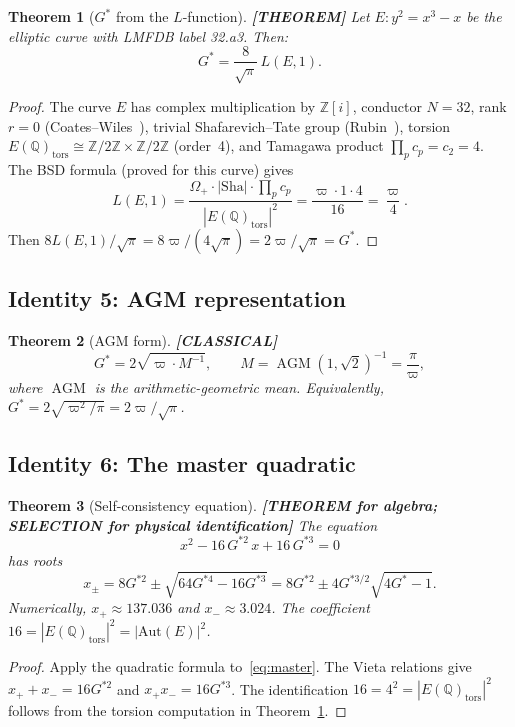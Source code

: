 \documentclass[11pt]{article}
\theoremstyle{tight}
\newtheorem{theorem}{Theorem}[section]
\theoremstyle{plainroman}
\newcommand{\Z}{\mathbb{Z}}
\newcommand{\Q}{\mathbb{Q}}
\begin{document}
\begin{theorem}[$G^*$ from the $L$-function]\label{thm:gstar-L}
\textbf{[THEOREM]}
Let $E:y^2=x^3-x$ be the elliptic curve with LMFDB label 32.a3.
Then:
\begin{equation}\label{eq:gstar-L}
G^*=\frac{8}{\sqrt{\pi}}\,L(E,1).
\end{equation}
\end{theorem}
\begin{proof}
The curve $E$ has complex multiplication by $\Z[i]$, conductor $N=32$, rank $r=0$ (Coates--Wiles~\cite{coateswiles}), trivial Shafarevich--Tate group (Rubin~\cite{rubin}), torsion $E(\Q)_{\mathrm{tors}}\cong\Z/2\Z\times\Z/2\Z$ (order~4), and Tamagawa product $\prod_p c_p=c_2=4$.
The BSD formula (proved for this curve) gives
\[
L(E,1)=\frac{\Omega_+\cdot|\text{Sha}|\cdot\prod_p c_p}{|E(\Q)_{\mathrm{tors}}|^2}=\frac{\varpi\cdot 1\cdot 4}{16}=\frac{\varpi}{4}.
\]
Then $8L(E,1)/\sqrt{\pi}=8\varpi/(4\sqrt{\pi})=2\varpi/\sqrt{\pi}=G^*$.
\end{proof}

\subsection{Identity 5: AGM representation}

\begin{theorem}[AGM form]\label{thm:agm}
\textbf{[CLASSICAL]}
\[
G^*=2\sqrt{\varpi\cdot M^{-1}}, \qquad M=\operatorname{AGM}(1,\sqrt{2})^{-1}=\frac{\pi}{\varpi},
\]
where $\operatorname{AGM}$ is the arithmetic-geometric mean.
Equivalently, $G^*=2\sqrt{\varpi^2/\pi}=2\varpi/\sqrt{\pi}$.
\end{theorem}

\subsection{Identity 6: The master quadratic}

\begin{theorem}[Self-consistency equation]\label{thm:master}
\textbf{[THEOREM for algebra; SELECTION for physical identification]}
The equation
\begin{equation}\label{eq:master}
x^2-16\,G^{*2}\,x+16\,G^{*3}=0
\end{equation}
has roots
\[
x_\pm=8G^{*2}\pm\sqrt{64G^{*4}-16G^{*3}}=8G^{*2}\pm 4G^{*3/2}\sqrt{4G^*-1}.
\]
Numerically, $x_+\approx 137.036$ and $x_-\approx 3.024$.
The coefficient $16=|E(\Q)_{\mathrm{tors}}|^2=|\mathrm{Aut}(E)|^2$.
\end{theorem}
\begin{proof}
Apply the quadratic formula to~\eqref{eq:master}.
The Vieta relations give $x_++x_-=16G^{*2}$ and $x_+x_-=16G^{*3}$.
The identification $16=4^2=|E(\Q)_{\mathrm{tors}}|^2$ follows from the torsion computation in Theorem~\ref{thm:gstar-L}.
\end{proof}
\end{document}
